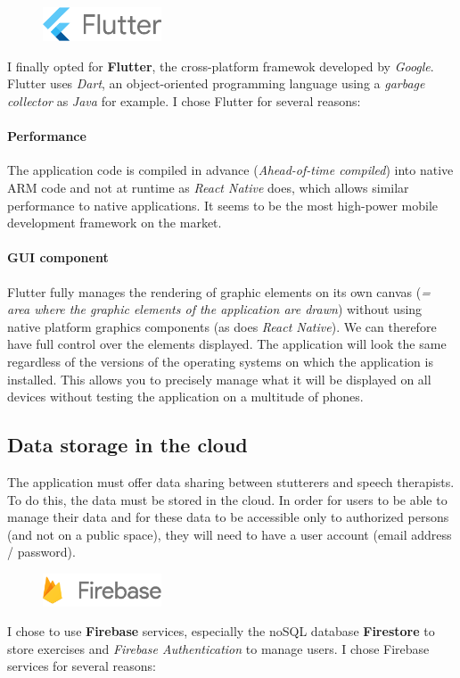 \begin{figure}
  \includegraphics[width=100pt]{content/imgs/flutter.png}
\end{figure}

I finally opted for \textbf{Flutter}, the cross-platform framewok developed by \textit{Google}. Flutter uses \textit{Dart}, an object-oriented programming language using a \textit{garbage collector} as \textit{Java} for example. I chose Flutter for several reasons:

\paragraph{Performance}
The application code is compiled in advance (\textit{Ahead-of-time compiled}) into native ARM code and not at runtime as \textit{React Native} does, which allows similar performance to native applications. It seems to be the most high-power mobile development framework on the market.

\paragraph{GUI component}
Flutter fully manages the rendering of graphic elements on its own canvas (\textit{= area where the graphic elements of the application are drawn}) without using native platform graphics components (as does \textit{React Native}). We can therefore have full control over the elements displayed. The application will look the same regardless of the versions of the operating systems on which the application is installed. This allows you to precisely manage what it will be displayed on all devices without testing the application on a multitude of phones.


\subsection{Data storage in the cloud}
The application must offer data sharing between stutterers and speech therapists. To do this, the data must be stored in the cloud. In order for users to be able to manage their data and for these data to be accessible only to authorized persons (and not on a public space), they will need to have a user account (email address / password).


\begin{figure}
  \includegraphics[width=100pt]{content/imgs/firebase.png}
\end{figure}
I chose to use \textbf{Firebase} services, especially the noSQL database \textbf{Firestore} to store exercises and  \textit{Firebase Authentication} to manage users. I chose Firebase services for several reasons:

